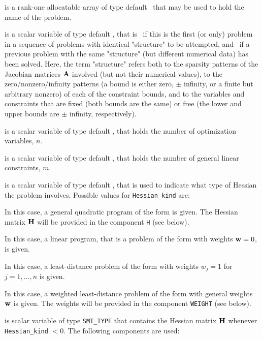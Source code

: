 \documentclass{galahad}
\begin{document}
\begin{description}

 is a rank-one allocatable array of type default \character\, that
may be used to hold the name of the problem.

 is a scalar variable of type default \logical,
 that is \true\ if this is the first (or only) problem in a sequence of
 problems with identical "structure" to be attempted, and \false\ if
 a previous problem with the same "structure" (but different
 numerical data) has been solved. Here, the term "structure" refers both to
 the sparsity patterns of the Jacobian matrices ${\mathbf{A}}$ involved
 (but not their numerical values), to the zero/nonzero/infinity patterns
 (a bound is either zero, $\pm$ infinity, or a finite but arbitrary
 nonzero) of each of the constraint bounds, and to the variables and constraints
 that are fixed (both bounds are the same) or free (the lower and upper
 bounds are $\pm$ infinity, respectively).

 is a scalar variable of type default \integer,
 that holds the number of optimization variables, $n$.

 is a scalar variable of type default \integer,
 that holds the number of general linear constraints, $m$.

 is a scalar variable of type default \integer,
that is used to indicate what type of Hessian the problem involves.
Possible values for {\tt Hessian\_kind} are:

\begin{description}
  In this case, a general quadratic program of the form
 is given. The Hessian matrix ${\mathbf{H}}$ will be provided in the
component {\tt H} (see below).

  In this case, a linear program, that is a problem of the form
 with weights ${\mathbf{w}} = 0$, is given.

 In this case, a least-distance problem of the form 
with weights $w_{j} = 1$ for $j = 1, \ldots , n$ is given.

 In this case, a weighted least-distance problem of the form 
with general weights ${\mathbf{w}}$ is given. The weights will be
provided in the component {\tt WEIGHT} (see below).
\end{description}

 is scalar variable of type {\tt SMT\_TYPE}
that contains the Hessian matrix ${\mathbf{H}}$ whenever {\tt Hessian\_kind} $<0$.
The following components are used:


\end{description}
\end{document}
